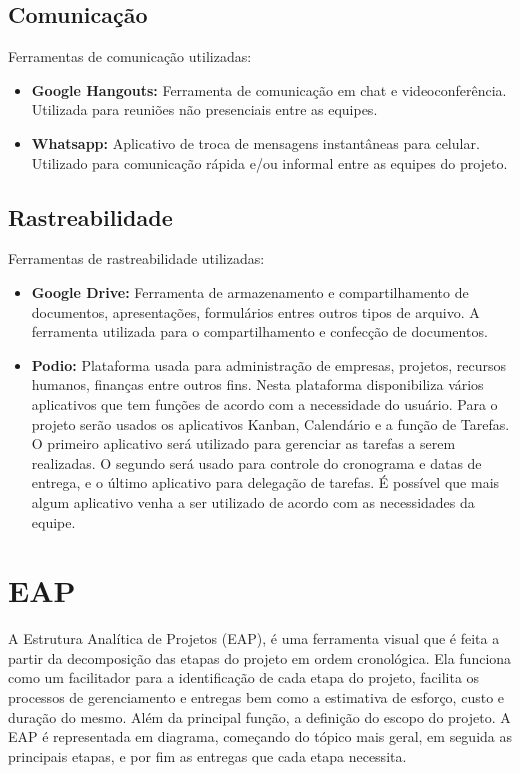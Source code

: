 \section{Comunicação}
Ferramentas de comunicação utilizadas:

	\begin{itemize}
		\item \textbf{Google Hangouts:} Ferramenta de comunicação em chat e videoconferência. Utilizada para reuniões não presenciais entre as equipes.
		\item \textbf{Whatsapp:} Aplicativo de troca de mensagens instantâneas para celular. Utilizado para comunicação rápida e/ou informal entre as equipes do projeto.
	\end{itemize}

\section{Rastreabilidade}
Ferramentas de rastreabilidade utilizadas:

	\begin{itemize}
		\item \textbf{Google Drive:} Ferramenta de armazenamento e compartilhamento de documentos, apresentações, formulários entres outros tipos de arquivo. A ferramenta utilizada para o compartilhamento e confecção de documentos.
		\item \textbf{Podio:} Plataforma usada para administração de empresas, projetos, recursos humanos, finanças entre outros fins. Nesta plataforma disponibiliza vários aplicativos que tem funções de acordo com a necessidade do usuário. Para o projeto serão usados os aplicativos Kanban, Calendário e a função de Tarefas. O primeiro aplicativo será utilizado para gerenciar as tarefas a serem realizadas. O segundo será usado para controle do cronograma e datas de entrega, e o último aplicativo para delegação de tarefas. É possível que mais algum aplicativo venha a ser utilizado de acordo com as necessidades da equipe.

	\end{itemize}

\chapter{EAP}
	A Estrutura Analítica de Projetos (EAP), é uma ferramenta visual que é feita a partir da decomposição das etapas do projeto em ordem cronológica. Ela funciona como um facilitador para a identificação de cada etapa do projeto, facilita os processos de gerenciamento e entregas bem como a estimativa de esforço, custo e duração do mesmo. Além da principal função, a definição do escopo do projeto. A EAP é representada em diagrama, começando do tópico mais geral, em seguida as principais etapas, e por fim as entregas que cada etapa necessita.

